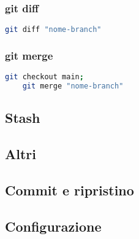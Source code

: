 \subsubsection{git diff}
\begin{lstlisting}[language=bash]
	git diff "nome-branch" 
\end{lstlisting}

\subsubsection{git merge}
\begin{lstlisting}[language=bash]
	git checkout main;
	git merge "nome-branch"
\end{lstlisting}



\subsection{Stash}



\subsection{Altri}


\subsection{Commit e ripristino}

\subsection{Configurazione}


